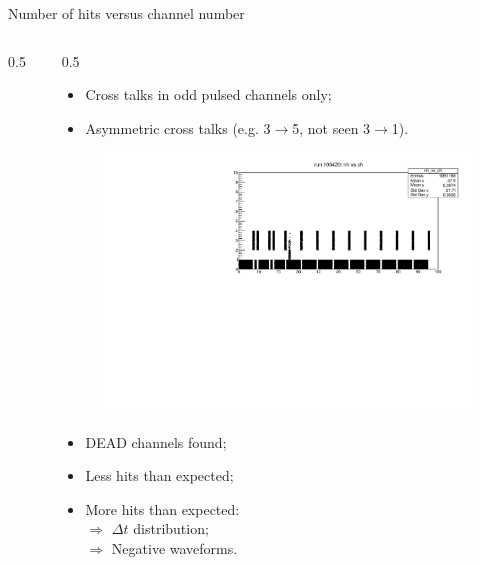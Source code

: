 \documentclass{beamer}[10pt]
\begin{document}
\begin{frame}{Number of hits versus channel number}
\begin{columns}
\begin{column}{0.5\framewidth}
\begin{figure}[H]
   \label{fig:wfgkgnvjkhl}
 \end{figure}
\end{column}
\begin{column}{0.5\framewidth}
\vspace{-7mm}
\begin{itemize}
\item  Cross talks in odd pulsed channels only;
\item  Asymmetric cross talks (e.g. 3$\rightarrow$5, not seen 3$\rightarrow$1).
\end{itemize}
\vspace{-4mm}
\begin{figure}[H]
   \centering
   \includegraphics[width= 1.0\columnwidth]{figures/pdf/nhitsvsch_105420.pdf}
   \label{fig:wffytl}
 \end{figure}
\vspace{-4mm}
\begin{itemize}
\item DEAD channels found;
\item Less hits than expected;
\item More hits than expected:
\\
$\Rightarrow$ $\Delta t$ distribution;
\\
$\Rightarrow$ Negative waveforms.
\end{itemize}
\end{column}
\end{columns}

\end{frame}
\end{document}
